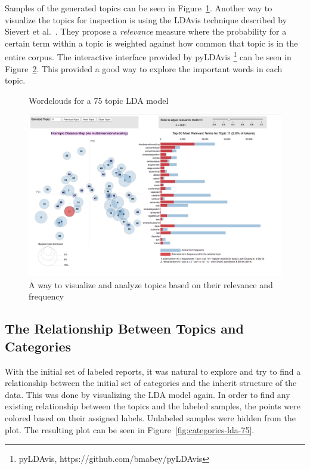 Samples of the generated topics can be seen in Figure~\ref{fig:topic-wordclouds}.
Another way to visualize the topics for inspection is using the LDAvis technique described by Sievert et al\@.~\cite{sievert2014ldavis}.
They propose a \textit{relevance} measure where the probability for a certain term within a topic is weighted against how common that topic is in the entire corpus.
The interactive interface provided by pyLDAvis \footnote{pyLDAvis, https://github.com/bmabey/pyLDAvis}  can be seen in Figure~\ref{fig:ldavis-sample}.
This provided a good way to explore the important words in each topic.

\begin{figure}
    \centering
    \caption{Wordclouds for a 75 topic LDA model}
    \label{fig:topic-wordclouds}
\end{figure}

\begin{figure}
    \centering
    \includegraphics[width=\textwidth]{figures/ldavis-sample.png}
    \caption{A way to visualize and analyze topics based on their relevance and frequency}
    \label{fig:ldavis-sample}
\end{figure}

\subsection{The Relationship Between Topics and Categories}

With the initial set of labeled reports, it was natural to explore and try to find a relationship between the initial set of categories and the inherit structure of the data.
This was done by visualizing the LDA model again.
In order to find any existing relationship between the topics and the labeled samples, the points were colored based on their assigned labels.
Unlabeled samples were hidden from the plot.
The resulting plot can be seen in Figure~\ref{fig:categories-lda-75}.

